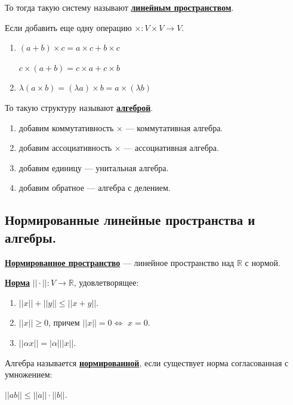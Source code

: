 \documentclass[twoside]{book}
\newcommand{\deff}[1]{\underline{\textbf{#1}}}
\begin{document}
То тогда такую систему называют \deff{линейным пространством}.

Если добавить еще одну операцию $\times: V \times V \rightarrow V$.

\begin{enumerate}
    \item $(a+b)\times c = a \times c + b \times c $

          $c\times (a+b) = c \times a + c \times b$

    \item $\lambda (a \times b) = (\lambda a )\times b = a \times (\lambda b)$
\end{enumerate}

То такую структуру называют \deff{алгеброй}.

\begin{enumerate}
    \item добавим коммутативность $\times$ --- коммутативная алгебра.

    \item добавим ассоциативность $\times$ --- ассоциативная алгебра.

    \item добавим единицу --- унитальная алгебра.

    \item добавим обратное --- алгебра с делением.
\end{enumerate}

\subsection{Нормированные линейные пространства и алгебры.}

\deff{Нормированное пространство} --- линейное пространство над $\mathbb{R}$ с нормой.

\deff{Норма} $||\cdot||:V \rightarrow \mathbb{R}$, удовлетворящее:

\begin{enumerate}
    \item $||x|| + ||y||\leq ||x+y||$.
    \item $||x||\geq 0$, причем $||x||=0 \Leftrightarrow$ $x = 0$.
    \item  $||\alpha x|| = |\alpha|||x||$.
\end{enumerate}

Алгебра называется \deff{нормированной}, если существует норма согласованная с умножением:

$||ab||\leq ||a|| \cdot ||b||$.
\end{document}
